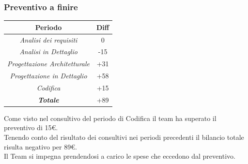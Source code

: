 \begin{frame}
	\frametitle{Preventivo a finire}
	
	\begin{center}
		\centering
		\begin{tabular}{|c|c|}
			\hline
			\textbf{Periodo} & \textbf{Diff} \\
			\hline
			\emph{Analisi dei requisiti}  & 0 \\
			\hline  \emph{Analisi in Dettaglio}  & -15 \\
			\hline  \emph{Progettazione Architetturale}  & +31 \\
			\hline  \emph{Progettazione in Dettaglio}  & +58 \\
			\hline  \emph{Codifica}  & +15 \\
			\hline  \emph{\textbf{Totale}}  & +89 \\
			\hline
		\end{tabular}
	\end{center}
	
	
Come visto nel consultivo del periodo di Codifica il team ha superato il preventivo di 15€.\\
Tenendo conto del risultato dei consultivi nei periodi precedenti il bilancio totale risulta negativo per 89€.\\
Il Team si impegna prendendosi a carico le spese che eccedono dal preventivo.
\end{frame}

